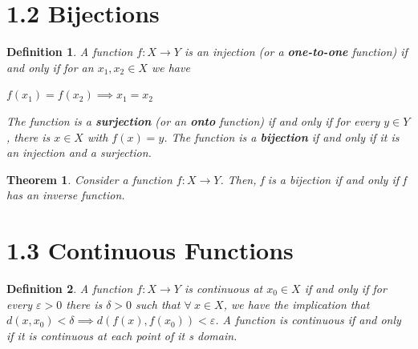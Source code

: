 \documentclass[executivepaper]{article}
\newtheorem{definition}{Definition}
\newtheorem{theorem}{Theorem}
\begin{document}
\section*{1.2 Bijections}

\begin{tcolorbox}

\begin{definition}

\textit{A function $f: X \rightarrow Y$ is an injection (or a \textbf{one-to-one} function) if and only if for an $x_{1}, x_{2} \in X$ we have}

\begin{center}

$f(x{_1})=f(x_{2}) \implies x_{1}=x_{2}$

\end{center}

\textit{The function is a \textbf{surjection} (or an \textbf{onto} function) if and only if for every $y \in Y$, there is $x \in X$ with $f(x)=y$. The function is a \textbf{bijection} if and only if it is an injection and a surjection.}

\end{definition}

\end{tcolorbox}

\vspace{2mm}

\begin{tcolorbox}

\begin{theorem}

\textit{Consider a function $f: X \rightarrow Y$. Then, f is a bijection if and only if f has an inverse function.}

\end{theorem}

\end{tcolorbox}

\pagebreak

\vspace*{-35mm}

\section*{1.3 Continuous Functions}

\begin{tcolorbox}

\begin{definition}

\textit{A function $f: X \rightarrow Y$ is continuous at $x_{0} \in X$ if and only if for every $\varepsilon > 0$ there is $\delta > 0$ such that $\forall ~ x \in X$, we have the implication that $d(x, x_{0}) < \delta \implies d(f(x), f(x_{0})) < \varepsilon$. A function is continuous if and only if it is continuous at each point of it s domain.}

\end{definition}

\end{tcolorbox}
\end{document}
